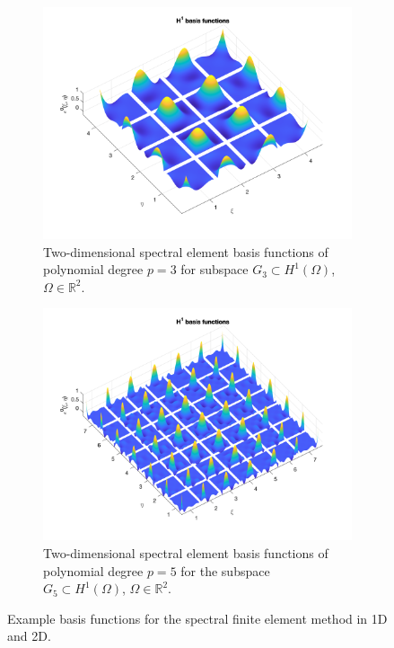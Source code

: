 \documentclass{project-logbook}
\begin{document}
\begin{figure}[htp]
				\begin{subfigure}{0.48\textwidth}
        					\centering
        						\includegraphics[width=\textwidth]{figures/sfem_p3.png}
        						\caption{Two-dimensional spectral element basis functions of polynomial degree $p = 3$ for subspace $G_{3} \subset H^{1}(\Omega)$, $\Omega\in\mathbb{R}^{2}$.}
    				\end{subfigure}
    				\hspace{.35cm}
    				\begin{subfigure}{0.48\textwidth}
        					\centering
        						\includegraphics[width=\textwidth]{figures/sfem_p5.png}
        						\caption{Two-dimensional spectral element basis functions of polynomial degree $p = 5$ for the subspace $G_{5} \subset H^{1}(\Omega)$, $\Omega\in\mathbb{R}^{2}$.}
    				\end{subfigure}

   				\vspace{.25cm}
    				\caption{Example basis functions for the spectral finite element method in 1D and 2D.}
    				\label{fig:plots}
		\end{figure}
\end{document}
